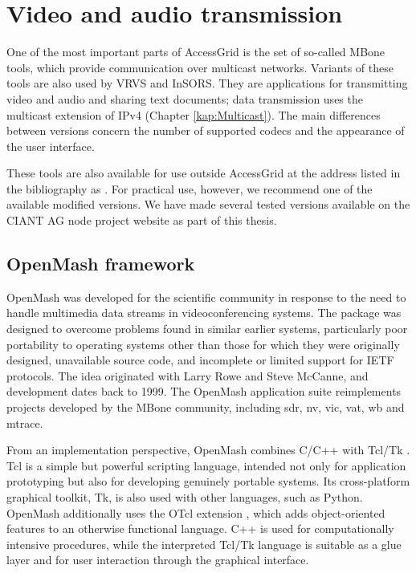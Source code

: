 \section{Video and audio transmission}

One of the most important parts of AccessGrid is the set of so-called MBone tools, which provide communication over multicast networks. Variants of these tools are also used by VRVS and InSORS. They are applications for transmitting video and audio and sharing text documents; data transmission uses the multicast extension of IPv4 (Chapter \ref{kap:Multicast}). The main differences between versions concern the number of supported codecs and the appearance of the user interface.

These tools are also available for use outside AccessGrid at the address listed in the bibliography as \cite{Original-MBone-Tools-Download}. For practical use, however, we recommend one of the available modified versions. We have made several tested versions available on the CIANT AG node project website \cite{CIANT-AGnodeWiki} as part of this thesis.

\subsection{OpenMash framework}\label{kap:OpenMash}
OpenMash \cite{OpenMashProject} was developed for the scientific community in response to the need to handle multimedia data streams in videoconferencing systems. The package was designed to overcome problems found in similar earlier systems, particularly poor portability to operating systems other than those for which they were originally designed, unavailable source code, and incomplete or limited support for IETF protocols. The idea originated with Larry Rowe and Steve McCanne, and development dates back to 1999. The OpenMash application suite reimplements projects developed by the MBone community, including sdr, nv, vic, vat, wb and mtrace.

From an implementation perspective, OpenMash combines C/C++ with Tcl/Tk \cite{WIKI-TCL-TK}. Tcl is a simple but powerful scripting language, intended not only for application prototyping but also for developing genuinely portable systems. Its cross-platform graphical toolkit, Tk, is also used with other languages, such as Python. OpenMash additionally uses the OTcl extension \cite{OTcl-Extension}, which adds object-oriented features to an otherwise functional language. C++ is used for computationally intensive procedures, while the interpreted Tcl/Tk language is suitable as a glue layer and for user interaction through the graphical interface.

